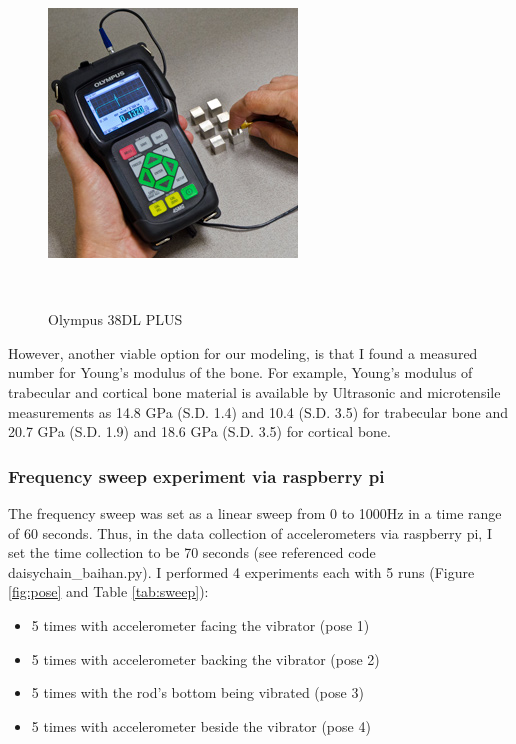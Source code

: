 \documentclass{sigchi}
\begin{document}
\begin{figure}
\centering
  \includegraphics[width=0.5\columnwidth]{figures/plastic-modulus}
  \caption{Olympus 38DL PLUS}~\label{fig:plastic-modulus}
\end{figure}

However, another viable option for our modeling, is that I found a measured number for Young's modulus of the bone. For example, Young's modulus of trabecular and cortical bone material is available by Ultrasonic and microtensile measurements \cite{boneYoung} as 14.8 GPa (S.D. 1.4) and 10.4 (S.D. 3.5) for trabecular bone and 20.7 GPa (S.D. 1.9) and 18.6 GPa (S.D. 3.5) for cortical bone.

\subsubsection{Frequency sweep experiment via raspberry pi} 

The frequency sweep was set as a linear sweep from 0 to 1000Hz in a time range of 60 seconds. Thus, in the data collection of accelerometers via raspberry pi, I set the time collection to be 70 seconds (see referenced code daisychain\_baihan.py). I performed 4 experiments each with 5 runs (Figure \ref{fig:pose} and Table \ref{tab:sweep}): 
\begin{itemize}
\item 5 times with accelerometer facing the vibrator (pose 1)
\item 5 times with accelerometer backing the vibrator (pose 2)
\item 5 times with the rod's bottom being vibrated (pose 3)
\item 5 times with accelerometer beside the vibrator (pose 4)
\end{itemize}
\end{document}
